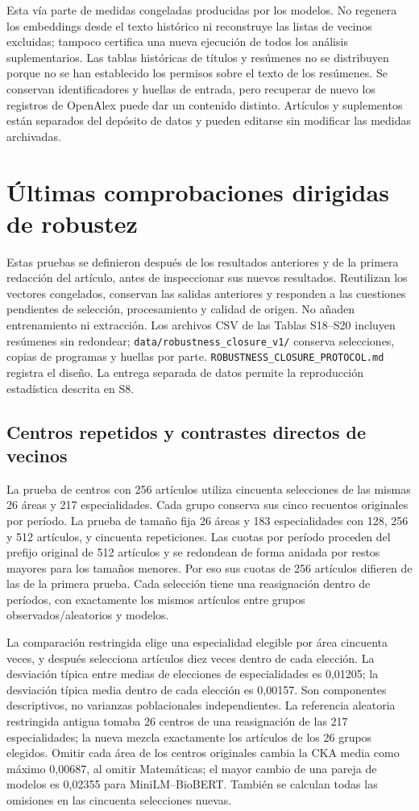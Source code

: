 \documentclass[12pt]{article}
\begin{document}
Esta vía parte de medidas congeladas producidas por los modelos. No regenera los embeddings desde el texto histórico ni reconstruye las listas de vecinos excluidas; tampoco certifica una nueva ejecución de todos los análisis suplementarios. Las tablas históricas de títulos y resúmenes no se distribuyen porque no se han establecido los permisos sobre el texto de los resúmenes. Se conservan identificadores y huellas de entrada, pero recuperar de nuevo los registros de OpenAlex puede dar un contenido distinto. Artículos y suplementos están separados del depósito de datos y pueden editarse sin modificar las medidas archivadas.


\clearpage
\section{Últimas comprobaciones dirigidas de robustez}
Estas pruebas se definieron después de los resultados anteriores y de la primera redacción del artículo, antes de inspeccionar sus nuevos resultados. Reutilizan los vectores congelados, conservan las salidas anteriores y responden a las cuestiones pendientes de selección, procesamiento y calidad de origen. No añaden entrenamiento ni extracción. Los archivos CSV de las Tablas S18--S20 incluyen resúmenes sin redondear; \nolinkurl{data/robustness_closure_v1/} conserva selecciones, copias de programas y huellas por parte. \nolinkurl{ROBUSTNESS_CLOSURE_PROTOCOL.md} registra el diseño. La entrega separada de datos permite la reproducción estadística descrita en S8.

\subsection{Centros repetidos y contrastes directos de vecinos}
La prueba de centros con 256 artículos utiliza cincuenta selecciones de las mismas 26 áreas y 217 especialidades. Cada grupo conserva sus cinco recuentos originales por período. La prueba de tamaño fija 26 áreas y 183 especialidades con 128, 256 y 512 artículos, y cincuenta repeticiones. Las cuotas por período proceden del prefijo original de 512 artículos y se redondean de forma anidada por restos mayores para los tamaños menores. Por eso sus cuotas de 256 artículos difieren de las de la primera prueba. Cada selección tiene una reasignación dentro de períodos, con exactamente los mismos artículos entre grupos observados/aleatorios y modelos.

La comparación restringida elige una especialidad elegible por área cincuenta veces, y después selecciona artículos diez veces dentro de cada elección. La desviación típica entre medias de elecciones de especialidades es 0,01205; la desviación típica media dentro de cada elección es 0,00157. Son componentes descriptivos, no varianzas poblacionales independientes. La referencia aleatoria restringida antigua tomaba 26 centros de una reasignación de las 217 especialidades; la nueva mezcla exactamente los artículos de los 26 grupos elegidos. Omitir cada área de los centros originales cambia la CKA media como máximo 0,00687, al omitir Matemáticas; el mayor cambio de una pareja de modelos es 0,02355 para MiniLM--BioBERT. También se calculan todas las omisiones en las cincuenta selecciones nuevas.
\end{document}
